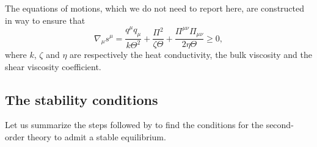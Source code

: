 \documentclass[a4paper, amsfonts, amssymb, amsmath, reprint, showkeys, nofootinbib, twoside]{revtex4-1}
\begin{document}
The equations of motions, which we do not need to report here, are constructed in way to ensure that
\begin{equation}\label{evrftjy}
\nabla_\mu s^\mu = \dfrac{q^\mu q_\mu}{k\Theta^2} + \dfrac{\Pi^2}{\zeta \Theta} + \dfrac{\Pi^{\mu \nu}\Pi_{\mu \nu}}{2\eta \Theta} \geq 0,
\end{equation}
where $k$, $\zeta$ and $\eta$ are respectively the heat conductivity, the bulk viscosity and the shear viscosity coefficient.

\subsection{The stability conditions}\label{BIS2}

Let us summarize the steps followed by \citet{Hishcock1983} to find the conditions for the second-order theory to admit a stable equilibrium.
\end{document}
